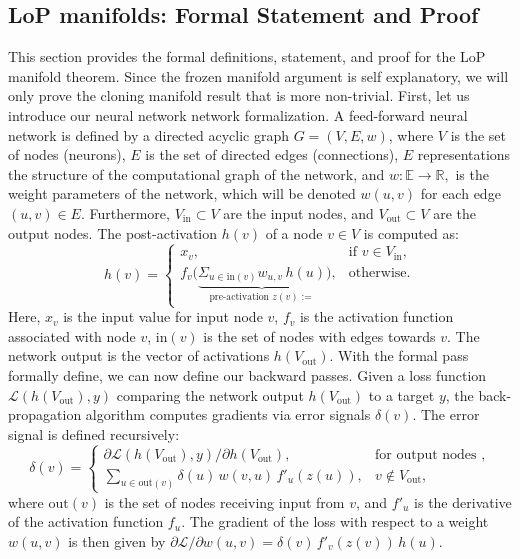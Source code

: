 \documentclass{article}
\newcommand{\Loss}{\mathcal{L}}
\newcommand{\R}{\mathbb{R}}
\newcommand{\E}{\mathbb{E}}
\numberwithin{figure}{section}
\begin{document}
\subsection{LoP manifolds: Formal Statement and Proof}
\label{app:cloning_manifold_details}
This section provides the formal definitions, statement, and proof for the LoP manifold theorem. Since the frozen manifold argument is self explanatory, we will only prove the cloning manifold result that is more non-trivial. 
First, let us introduce our neural network network formalization. 
A feed-forward neural network is defined by a directed acyclic graph $G=(V,E, w)$, where $V$ is the set of nodes (neurons), $E$ is the set of directed edges (connections), $E$ representations the structure of the computational graph of the network, and  $w:\E \to \R,$ is the weight parameters of the network, which will be denoted $w(u,v)$ for each edge $(u,v)\in E$. Furthermore, $V_{\text{in}} \subset V$ are the input nodes, and $V_{\text{out}} \subset V$ are the output nodes. The post-activation $h(v)$ of a node $v \in V$ is computed as:
\[
h(v)=
\begin{cases}
x_v, & \text{if } v\in V_{\text{in}},\\
f_v \Big(\underbrace{\Sigma_{u\in \text{in}(v)}w_{u,v}\,h(u)}_{\text{pre-activation }z(v):=}\Big), &\text{otherwise}.
\end{cases}
\]
Here, $x_v$ is the input value for input node $v$, $f_v$ is the activation function associated with node $v$, $\mathrm{in}(v)$ is the set of nodes with edges towards $v.$ The network output is the vector of activations $h(V_{\text{out}})$. 
With the formal pass formally define, we can now define our backward passes.  Given a loss function $\Loss(h(V_{\text{out}}),y)$ comparing the network output $h(V_{\text{out}})$ to a target $y$, the back-propagation algorithm computes gradients via error signals $\delta(v)$. The error signal is defined recursively:
\[
\delta(v)=
\begin{cases}
\partial\Loss(h(V_{\text{out}}),y)/\partial h(V_{\text{out}}), & \text{for output nodes },\\[4pt]
\displaystyle\sum_{u\in\mathrm{out}(v)}\delta(u)\,w(v,u)\,f'_u(z(u)), &v\notin V_{\text{out}},
\end{cases}
\]
where $\mathrm{out}(v)$ is the set of nodes receiving input from $v$, and $f'_u$ is the derivative of the activation function $f_u$. The gradient of the loss with respect to a weight $w(u,v)$ is then given by $\partial\Loss/\partial w(u,v)=\delta(v)\,f'_v(z(v))\,h(u)$.
\end{document}
